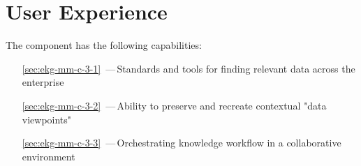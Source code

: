 \chapter{User Experience}\label{ch:ekg-mm-c-3}

The  component has the following capabilities:

\begin{itemize}[leftmargin=.5in]
  \item [\ref{sec:ekg-mm-c-3-1}] \,---\,Standards and tools for finding relevant data across the enterprise
  \item [\ref{sec:ekg-mm-c-3-2}] \,---\,Ability to preserve and recreate contextual "data viewpoints"
  \item [\ref{sec:ekg-mm-c-3-3}] \,---\,Orchestrating knowledge workflow in a collaborative environment
\end{itemize}






